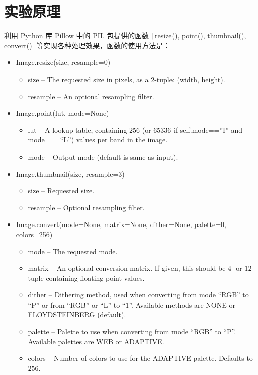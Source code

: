 \documentclass[11pt]{ctexart}
\begin{document}
\section{实验原理}

利用 Python 库 Pillow 中的 PIL 包提供的函数 \texttt|resize(), point(), thumbnail(), convert()| 等实现各种处理效果，函数的使用方法是：

\begin{itemize}
    \item Image.resize(size, resample=0)
    \begin{itemize}
        \item size – The requested size in pixels, as a 2-tuple: (width, height).
        \item resample – An optional resampling filter. 
    \end{itemize}
    \item Image.point(lut, mode=None)
    \begin{itemize}
        \item lut – A lookup table, containing $256$ (or $65336$ if self.mode==”I” and mode == “L”) values per band in the image. 
        \item mode – Output mode (default is same as input).
    \end{itemize}
    \item Image.thumbnail(size, resample=3)
    \begin{itemize}
        \item size – Requested size.
        \item resample – Optional resampling filter.
    \end{itemize}
    \item Image.convert(mode=None, matrix=None, dither=None, palette=0, colors=256)
    \begin{itemize}
        \item mode – The requested mode.
        \item matrix – An optional conversion matrix. If given, this should be $4$- or $12$-tuple containing floating point values.
        \item dither – Dithering method, used when converting from mode “RGB” to “P” or from “RGB” or “L” to “$1$”. Available methods are NONE or FLOYDSTEINBERG (default).
        \item palette – Palette to use when converting from mode “RGB” to “P”. Available palettes are WEB or ADAPTIVE.
        \item colors – Number of colors to use for the ADAPTIVE palette. Defaults to $256$.
    \end{itemize}
\end{itemize}
\end{document}
